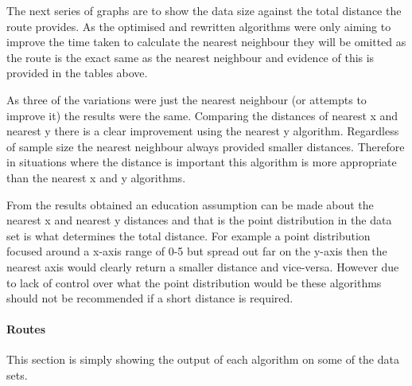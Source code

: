 \documentclass[conference,backref=page]{acmsiggraph}
\begin{document}
The next series of graphs are to show the data size against the total distance the route provides. As the optimised and rewritten algorithms were only aiming to improve the time taken to calculate the nearest neighbour they will be omitted as the route is the exact same as the nearest neighbour and evidence of this is provided in the tables above. 



As three of the variations were just the nearest neighbour (or attempts to improve it) the results were the same. Comparing the distances of nearest x and nearest y there is a clear improvement using the nearest y algorithm. Regardless of sample size the nearest neighbour always provided smaller distances. Therefore in situations where the distance is important this algorithm is more appropriate than the nearest x and y algorithms. 

From the results obtained an education assumption can be made about the nearest x and nearest y distances and that is the point distribution in the data set is what determines the total distance. For example a point distribution focused around a x-axis range of 0-5 but spread out far on the y-axis then the nearest axis would clearly return a smaller distance and vice-versa. However due to lack of control over what the point distribution would be these algorithms should not be recommended if a short distance is required.


\paragraph{Routes}

This section is simply showing the output of each algorithm on some of the data sets. 
\end{document}
